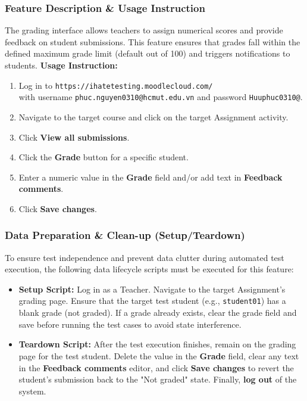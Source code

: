 \documentclass[twoside,final]{hcmut-report}
\begin{document}
\subsubsection{Feature Description \& Usage Instruction}
The grading interface allows teachers to assign numerical scores and provide feedback on student submissions. This feature ensures that grades fall within the defined maximum grade limit (default out of 100) and triggers notifications to students.
\newline
\textbf{Usage Instruction:}
\begin{enumerate}
    \item Log in to \texttt{https://ihatetesting.moodlecloud.com/}\\ with username \texttt{phuc.nguyen0310@hcmut.edu.vn} and password \texttt{Huuphuc0310@}.
    \item Navigate to the target course and click on the target Assignment activity.
    \item Click \textbf{View all submissions}.
    \item Click the \textbf{Grade} button for a specific student.
    \item Enter a numeric value in the \textbf{Grade} field and/or add text in \textbf{Feedback comments}.
    \item Click \textbf{Save changes}.
\end{enumerate}

\subsubsection{Data Preparation \& Clean-up (Setup/Teardown)}
To ensure test independence and prevent data clutter during automated test execution, the following data lifecycle scripts must be executed for this feature:
\begin{itemize}
    \item \textbf{Setup Script:} Log in as a Teacher. Navigate to the target Assignment's grading page. Ensure that the target test student (e.g., \texttt{student01}) has a blank grade (not graded). If a grade already exists, clear the grade field and save before running the test cases to avoid state interference.
    \item \textbf{Teardown Script:} After the test execution finishes, remain on the grading page for the test student. Delete the value in the \textbf{Grade} field, clear any text in the \textbf{Feedback comments} editor, and click \textbf{Save changes} to revert the student's submission back to the "Not graded" state. Finally, \textbf{log out} of the system.
\end{itemize}
\end{document}
